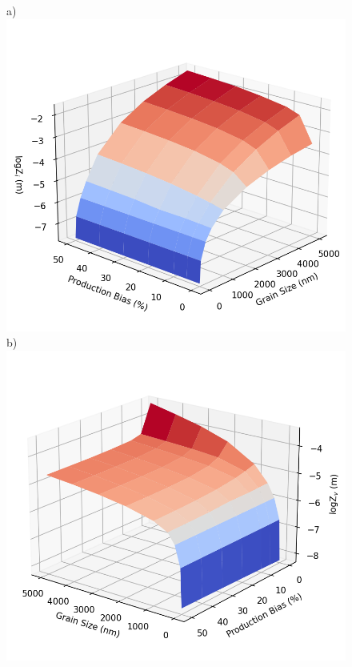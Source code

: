 \documentclass[utf8]{frontiersSCNS} %
\begin{document}
\clearpage
    \begin{figure}[h!]  %
        \centering
        a)\includegraphics[scale=0.55]{Fig12_a}
        b)\includegraphics[scale=0.55]{Fig12_b}

\end{figure}
\end{document}
